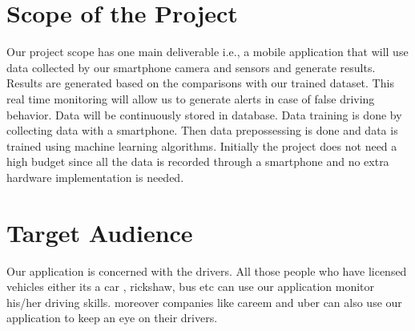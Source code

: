 \chapter{Scope of the Project}
Our project scope has one main deliverable i.e., a mobile application that will
use data collected by our smartphone camera and sensors and generate results. Results are
generated based on the comparisons with our trained dataset. This real time monitoring will
allow us to generate alerts in case of false driving behavior. Data will be continuously stored
in database.
Data training is done by collecting data with a smartphone. Then data prepossessing is done
and data is trained using machine learning algorithms. Initially the project does not need a
high budget since all the data is recorded through a smartphone and no extra hardware
implementation is needed.
\chapter{Target Audience}
Our application is concerned with the drivers. All those people who have licensed vehicles either its a car , rickshaw, bus etc can use our application monitor his/her driving skills. moreover companies like careem and uber can also use our application to keep an eye on their drivers.

